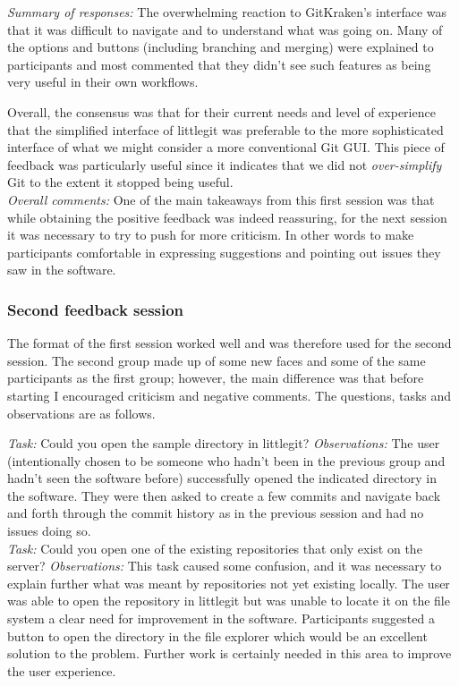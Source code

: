 \noindent \emph{Summary of responses: } The overwhelming reaction to GitKraken's interface was that it was difficult to navigate and to understand what was going on. Many of the options and buttons (including branching and merging) were explained to participants and most commented that they didn't see such features as being very useful in their own workflows. 

Overall, the consensus was that for their current needs and level of experience that the simplified interface of littlegit was preferable to the more sophisticated interface of what we might consider a more conventional Git GUI. This piece of feedback was particularly useful since it indicates that we did not \emph{over-simplify} Git to the extent it stopped being useful. \\

\noindent \emph{Overall comments: } One of the main takeaways from this first session was that while obtaining the positive feedback was indeed reassuring, for the next session it was necessary to try to push for more criticism. In other words to make participants comfortable in expressing suggestions and pointing out issues they saw in the software.

\subsubsection{Second feedback session}

The format of the first session worked well and was therefore used for the second session. The second group made up of some new faces and some of the same participants as the first group; however, the main difference was that before starting I encouraged criticism and negative comments. The questions, tasks and observations are as follows.

\noindent \emph{Task: } Could you open the sample directory in littlegit?
\noindent \emph{Observations: } The user (intentionally chosen to be someone who hadn't been in the previous group and hadn't seen the software before) successfully opened the indicated directory in the software. They were then asked to create a few commits and navigate back and forth through the commit history as in the previous session and had no issues doing so.\\

\noindent \emph{Task: } Could you open one of the existing repositories that only exist on the server?
\noindent \emph{Observations: } This task caused some confusion, and it was necessary to explain further what was meant by repositories not yet existing locally. The user was able to open the repository in littlegit but was unable to locate it on the file system a clear need for improvement in the software. Participants suggested a button to open the directory in the file explorer which would be an excellent solution to the problem. Further work is certainly needed in this area to improve the user experience. 

